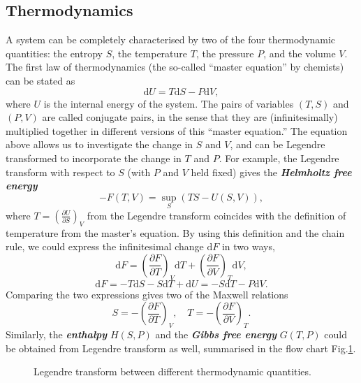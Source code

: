 \documentclass{article}
\theoremstyle{nonumberplain}
\begin{document}
\subsection{Thermodynamics}
A system can be completely characterised by two of the four thermodynamic quantities: the entropy $S$, the temperature $T$, the pressure $P$, and the volume $V$. The first law of thermodynamics (the so-called ``master equation'' by chemists) can be stated as
\begin{equation} 
    \mathrm{d} U = T \mathrm{d} S - P \mathrm{d} V, \label{eq:thermo-master}
\end{equation}
where $U$ is the internal energy of the system. The pairs of variables $(T, S)$ and $(P, V)$ are called conjugate pairs, in the sense that they are (infinitesimally) multiplied together in different versions of this ``master equation.'' The equation above allows us to investigate the change in $S$ and $V$, and can be Legendre transformed to incorporate the change in $T$ and $P$. For example, the Legendre transform with respect to $S$ (with $P$ and $V$ held fixed) gives the \textit{\textbf{Helmholtz free energy}} 
\[
    -F(T,V) = \sup_{S} \left( TS - U(S,V)\right),
\]
where $T = \left( \frac{\partial U}{\partial S} \right)_V$ from the Legendre transform coincides with the definition of temperature from the master's equation. By using this definition and the chain rule, we could express the infinitesimal change $\mathrm{d} F$ in two ways, 
\[
    \mathrm{d} F = \left(\frac{\partial F}{\partial T} \right)_V \mathrm{d} T +
    \left(\frac{\partial F}{\partial V} \right)_T \mathrm{d} V,
\]
\[
    \mathrm{d} F 
    = -T \mathrm{d} S - S \mathrm{d} T + \mathrm{d} U
    =  -S \mathrm{d} T - P \mathrm{d} V.
\]
Comparing the two expressions gives two of the Maxwell relations 
\[
    S = -\left(\frac{\partial F}{\partial T} \right)_V, 
    \quad 
    T =  -\left(\frac{\partial F}{\partial V} \right)_T.
\]
Similarly, the \textit{\textbf{enthalpy}}  $H(S,P)$ and the \textit{\textbf{Gibbs free energy}} $G(T,P)$ could be obtained from Legendre transform as well, summarised in the flow chart Fig.\ref{fig:thermo}.
\begin{figure}[h]
    \centering
    \def\svgwidth{0.6\columnwidth}
    
    \caption{Legendre transform between different thermodynamic quantities.}
    \label{fig:thermo}
\end{figure}
\end{document}
